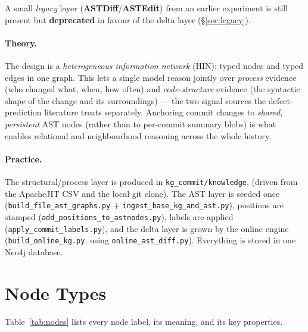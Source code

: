 \documentclass[11pt,a4paper]{article}
\newcommand{\node}[1]{\textcolor{kgblue}{\textbf{#1}}}
\begin{document}
A small \emph{legacy} layer (\node{ASTDiff}/\node{ASTEdit}) from an earlier
experiment is still present but \textbf{deprecated} in favour of the delta layer
(\S\ref{sec:legacy}).

\paragraph{Theory.} The design is a \emph{heterogeneous information network}
(HIN): typed nodes and typed edges in one graph. This lets a single model reason
jointly over \emph{process} evidence (who changed what, when, how often) and
\emph{code-structure} evidence (the syntactic shape of the change and its
surroundings) --- the two signal sources the defect-prediction literature treats
separately. Anchoring commit changes to \emph{shared, persistent} AST nodes
(rather than to per-commit summary blobs) is what enables relational and
neighbourhood reasoning across the whole history.

\paragraph{Practice.} The structural/process layer is produced in \texttt{kg\_commit/knowledge}, (driven from the ApacheJIT CSV
and the local git clone). The AST layer is seeded once
(\texttt{build\_file\_ast\_graphs.py} $+$ \texttt{ingest\_base\_kg\_and\_ast.py}),
positions are stamped (\texttt{add\_positions\_to\_astnodes.py}), labels are
applied (\texttt{apply\_commit\_labels.py}), and the delta layer is grown by the
online engine (\texttt{build\_online\_kg.py}, using
\texttt{online\_ast\_diff.py}). Everything is stored in one Neo4j database.

\section{Node Types}
Table~\ref{tab:nodes} lists every node label, its meaning, and its key
properties.
\end{document}
